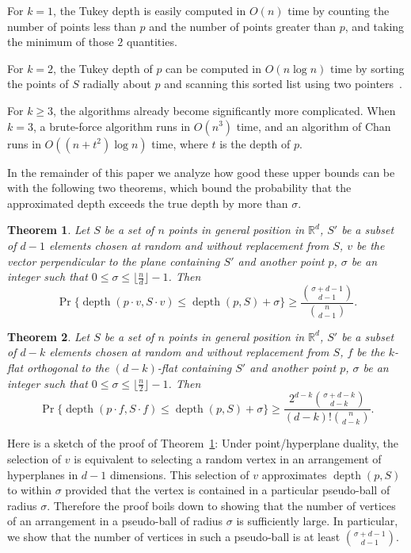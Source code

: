 \documentclass[preprint, 12pt]{elsarticle}
\newtheorem{theorem}{Theorem}%
\DeclareMathOperator{\depth}{depth}
\begin{document}
For $k = 1$, the Tukey depth is easily computed in $O(n)$ time by counting the number of points less than $p$ and the number of points greater than $p$, and taking the minimum of those $2$ quantities.

For $k = 2$, the Tukey depth of $p$ can be computed in $O(n\log n)$ time by sorting the points of $S$ radially about $p$ and scanning this sorted list using two pointers~\cite{Rousseeuw98}.

For $k \geq 3$, the algorithms already become significantly more complicated. When $k = 3$, a brute-force algorithm runs in $O(n^{3})$ time, and an algorithm of Chan~\cite{Chan05} runs in $O((n + t^{2})\log n)$ time, where $t$ is the depth of $p$.

In the remainder of this paper we analyze how good these upper bounds can be with the following two theorems, which bound the probability that the approximated depth exceeds the true depth by more than $\sigma$.
\begin{theorem}
\label{thm:ballofvertices}
  Let $S$ be a set of $n$ points in general position in $\mathbb{R}^{d}$, $S'$ be a subset of $d-1$ elements chosen at random and without replacement from $S$, $v$ be the vector perpendicular to the plane containing $S'$ and another point $p$, $\sigma$ be an integer such that $0 \leq \sigma \leq \lfloor \frac{n}{d}\rfloor - 1$. Then
\[ \Pr\{ \depth{(p \cdot v, S \cdot v)} \leq \depth{(p, S)} + \sigma \} \geq \frac{\binom{\sigma+d-1}{d-1}}{\binom{n}{d-1}}.\]
\end{theorem}
\begin{theorem}
\label{thm:ballofflats}
  Let $S$ be a set of $n$ points in general position in $\mathbb{R}^{d}$, $S'$ be a subset of $d-k$ elements chosen at random and without replacement from $S$, $f$ be the $k$-flat orthogonal to the $(d - k)$-flat containing $S'$ and another point $p$, $\sigma$ be an integer such that $0 \leq \sigma \leq \lfloor \frac{n}{2}\rfloor - 1$. Then
\[ \Pr\{ \depth{(p \cdot f, S \cdot f)} \leq \depth{(p, S)} + \sigma \} \geq \frac{2^{d-k}\binom{\sigma + d-k}{d-k}}{(d-k)!\binom{n}{d-k}}.\]
\end{theorem}

Here is a sketch of the proof of Theorem~\ref{thm:ballofvertices}:  Under
point/hyperplane duality, the selection of $v$ is equivalent to selecting
a random vertex in an arrangement of hyperplanes in $d-1$ dimensions.
This selection of $v$ approximates $\depth{(p, S)}$ to within $\sigma$
provided that the vertex is contained in a particular pseudo-ball of radius
$\sigma$. Therefore the proof boils down to showing that the number
of vertices of an arrangement in a pseudo-ball of radius $\sigma$ is
sufficiently large. In particular, we show that the number of vertices
in such a pseudo-ball is at least $\binom{\sigma+d-1}{d-1}$.
\end{document}
